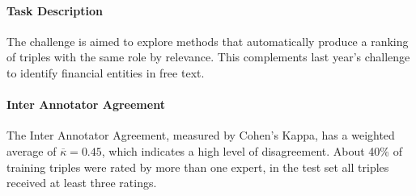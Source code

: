 
{\setlength{\parindent}{0cm}
\paragraph{\textbf{Task Description}}
The challenge is aimed to explore methods that automatically produce a ranking of triples with the same role by relevance.
This complements last year's challenge to identify financial entities in free text\cite{dsmm16}.
}

{\setlength{\parindent}{0cm}
\paragraph{\textbf{Inter Annotator Agreement}}
The Inter Annotator Agreement, measured by Cohen's Kappa\cite{ir}, has a weighted average of $\overline{\kappa}=0.45$, which indicates a high level of disagreement.
About 40\% of training triples were rated by more than one expert, in the test set all triples received at least three ratings.

}




